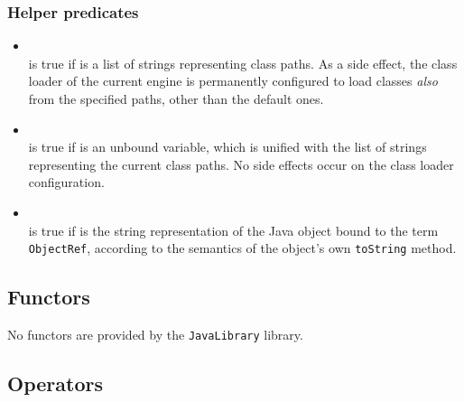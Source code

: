 \subsubsection{Helper predicates}

\begin{itemize}
\item {}\\
    \noindent{} is true if  is a list of strings representing class paths. As a side effect, the \tuprolog{} class loader of the current \tuprolog{} engine is permanently configured to load classes \textit{also} from the specified paths, other than the default ones.


\item {}\\
    \noindent{} is true if  is an unbound variable, which is unified with the list of strings representing the current class paths. No side effects occur on the \tuprolog{} class loader configuration.


\item {}\\
    \noindent{} is true if
     is the string representation of the Java object bound to the term \texttt{ObjectRef}, according to the semantics of the object's own \texttt{toString} method.

\end{itemize}

\subsection{Functors}

No functors are provided by the \texttt{JavaLibrary} library.

\subsection{Operators}

